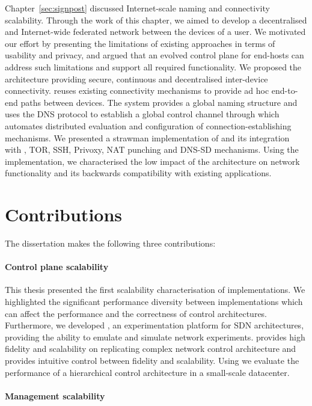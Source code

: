 Chapter~\ref{sec:signpost} discussed Internet-scale naming and connectivity
scalability.  Through the work of this chapter, we aimed to develop a
decentralised and Internet-wide federated network between the devices of a user.
We motivated our effort by presenting the limitations of existing approaches in
terms of usability and privacy, and argued that an evolved control plane for
end-hosts can address such limitations and support all required functionality.
We proposed the \signpost architecture providing secure, continuous and
decentralised inter-device connectivity. \signpost reuses existing connectivity
mechanisms to provide ad hoc end-to-end paths between devices. The system
provides a global naming structure and uses the DNS protocol to establish a
global control channel through which \signpost automates distributed evaluation
and configuration of connection-establishing mechanisms.  We presented a
strawman implementation  of \signpost and its integration with
\openvpn, TOR, SSH, Privoxy, NAT punching and DNS-SD mechanisms.  Using the
\signpost implementation, we characterised the low impact of the
architecture on network functionality and its backwards compatibility with
existing applications. 

\section{Contributions}

The dissertation makes the following three contributions:

\paragraph{Control plane scalability} 
This thesis presented the first scalability characterisation of \of
implementations. We highlighted the significant performance diversity between
implementations which can affect the performance and the correctness of control
architectures.  Furthermore, we developed \sdnsim, an experimentation platform
for SDN architectures, providing the ability to emulate and simulate network
experiments. \sdnsim provides high fidelity and scalability on replicating complex
network control architecture
and provides intuitive control between fidelity and scalability. 
Using \sdnsim we evaluate the performance of a hierarchical control architecture
in a small-scale datacenter.

\paragraph{Management scalability}

